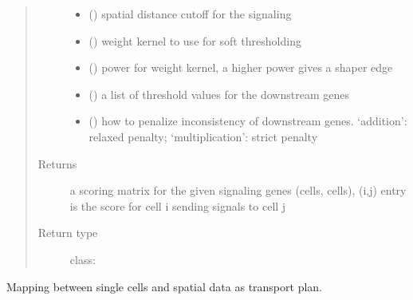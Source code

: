 \documentclass[letterpaper,10pt,english]{sphinxmanual}
\begin{document}
\begin{fulllineitems}
\begin{fulllineitems}
\begin{quote}
\begin{description}
\begin{itemize}
\item {} 
 () \textendash{} spatial distance cutoff for the signaling

\item {} 
 (\sphinxstyleliteralemphasis{, }) \textendash{} weight kernel to use for soft thresholding

\item {} 
 (\sphinxstyleliteralemphasis{, }) \textendash{} power for weight kernel, a higher power gives a shaper edge

\item {} 
 (\sphinxstyleliteralemphasis{, }) \textendash{} a list of threshold values for the downstream genes

\item {} 
 (\sphinxstyleliteralemphasis{, }) \textendash{} how to penalize inconsistency of downstream genes. ‘addition’: relaxed penalty; ‘multiplication’: strict penalty

\end{itemize}

\item[{Returns}] \leavevmode
a scoring matrix for the given signaling genes (cells, cells), (i,j) entry is the score for cell i sending signals to cell j

\item[{Return type}] \leavevmode
class:

\end{description}\end{quote}

\end{fulllineitems}


\begin{fulllineitems}
\label{\detokenize{api:spaotsc.SpaOTsc.spatial_sc.transport_plan}}
Mapping between single cells and spatial data as transport plan.


\end{fulllineitems}
\end{fulllineitems}
\end{document}
